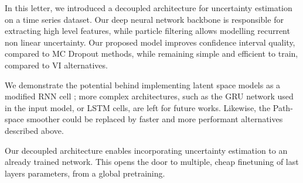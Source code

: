 \documentclass[journal]{IEEEtran}
\begin{document}
In this letter, we introduced a decoupled architecture for uncertainty estimation on a time series dataset.
Our deep neural network backbone is responsible for extracting high level features, while particle filtering allows modelling recurrent non linear uncertainty.
Our proposed model improves confidence interval quality, compared to MC Dropout methods, while remaining simple and efficient to train, compared to VI alternatives.

We demonstrate the potential behind implementing latent space models as a modified RNN cell ;
more complex architectures, such as the GRU network used in the input model, or LSTM cells, are left for future works.
Likewise, the Path-space smoother could be replaced by faster and more performant alternatives described above.

Our decoupled architecture enables incorporating uncertainty estimation to an already trained network.
This opens the door to multiple, cheap finetuning of last layers parameters, from a global pretraining.

\clearpage


\end{document}
